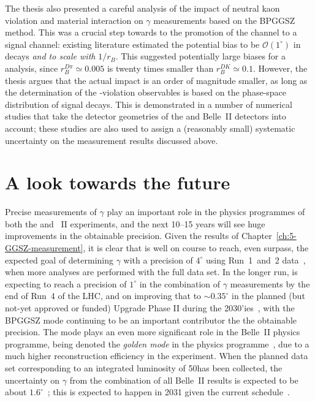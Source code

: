 The thesis also presented a careful analysis of the impact of neutral kaon \CP violation and material interaction on $\gamma$ measurements based on the BPGGSZ method. This was a crucial step towards to the promotion of the \BtoDpi channel to a signal channel: existing literature estimated the potential bias to be $\mathcal O(1^\circ)$ in \BtoDK decays \emph{and to scale with} $1/r_B$. This suggested potentially large biases for a \BtoDpi analysis, since $r_B^{D\pi}\simeq0.005$ is twenty times smaller than $r_B^{DK}\simeq 0.1$. However, the thesis argues that the actual impact is an order of magnitude smaller, as long as the determination of the \CP-violation observables is based on the phase-space distribution of signal decays. This is demonstrated in a number of numerical studies that take the detector geometries of the \lhcb and Belle~II detectors into account; these studies are also used to assign a (reasonably small) systematic uncertainty on the measurement results discussed above.

\section{A look towards the future} %
\label{sec:a_look_towards_the_future}


Precise measurements of $\gamma$ play an important role in the physics programmes of both the \lhcb and \belle~II experiments, and the next 10--15 years will see huge improvements in the obtainable precision. Given the results of Chapter~\ref{ch:5-GGSZ-measurement}, it is clear that \lhcb is well on course to reach, even surpass, the expected goal of determining $\gamma$ with a precision of $4^\circ$ using Run~1~and~2 data~\cite{LHCbUpgradeITDR}, when more analyses are performed with the full data set. In the longer run, \lhcb is expecting to reach a precision of $1^\circ$ in the combination of $\gamma$ measurements by the end of Run~4 of the LHC, and on improving that to $\sim 0.35^\circ$ in the planned (but not-yet approved or funded) Upgrade Phase II during the 2030'ies~\cite{lhcbcollaborationPhysicsCaseLHCb2019}, with the BPGGSZ mode continuing to be an important contributor the the obtainable precision. The mode plays an even more significant role in the Belle~II physics programme, being denoted the \emph{golden mode} in the physics programme~\cite{kouBelleIIPhysics2019}, due to a much higher \KS reconstruction efficiency in the experiment. When the planned data set corresponding to an integrated luminosity of 50\invab has been collected, the uncertainty on $\gamma$ from the combination of all Belle~II results is expected to be about $1.6^\circ$~\cite{kouBelleIIPhysics2019}; this is expected to happen in 2031 given the current schedule~\cite{BelleTimescale}.

